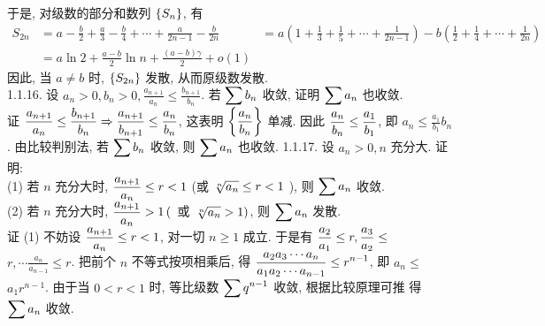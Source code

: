 \documentclass[a4paper,11pt,UTF8]{article}
\begin{document}
于是, 对级数的部分和数列 $\displaystyle \displaystyle \displaystyle \left\{S_n\right\}$, 有
$$
\begin{aligned}
	S_{2 n}&=a-\frac{b}{2}+\frac{a}{3}-\frac{b}{4}+\cdots+\frac{a}{2 n-1}-\frac{b}{2 n}
	& =a\left(1+\frac{1}{3}+\frac{1}{5}+\cdots+\frac{1}{2 n-1}\right)-b\left(\frac{1}{2}+\frac{1}{4}+\cdots+\frac{1}{2 n}\right) \\
	& =a \ln 2+\frac{a-b}{2} \ln n+\frac{(a-b) \gamma}{2}+o(1)
\end{aligned}
$$
因此, 当 $a \neq b$ 时, $\displaystyle \displaystyle \displaystyle \left\{S_{2 n}\right\}$ 发散, 从而原级数发散.\\
1.1.16. 设 $a_n>0, b_n>0, \frac{a_{n+1}}{a_n} \leq \frac{b_{n+1}}{b_n}$. 若 $\displaystyle \displaystyle \displaystyle \sum b_n$ 收敛, 证明 $\displaystyle \displaystyle \displaystyle \sum a_n$ 也收敛.\\
证 $\displaystyle \displaystyle \displaystyle \frac{a_{n+1}}{a_n} \leq \frac{b_{n+1}}{b_n} \Rightarrow \frac{a_{n+1}}{b_{n+1}} \leq \frac{a_n}{b_n}$, 这表明 $\displaystyle \displaystyle \displaystyle \left\{\frac{a_n}{b_n}\right\}$ 单减. 因此 $\displaystyle \displaystyle \displaystyle \frac{a_n}{b_n} \leq \frac{a_1}{b_1}$, 即 $a_n \leq \frac{a_1}{b_1} b_n$. 由比较判别法, 若 $\displaystyle \displaystyle \displaystyle \sum b_n$ 收敛, 则 $\displaystyle \displaystyle \displaystyle \sum a_n$ 也收敛.
1.1.17. 设 $a_n>0, n$ 充分大. 证明:\\
(1) 若 $n$ 充分大时, $\displaystyle \displaystyle \displaystyle \frac{a_{n+1}}{a_n} \leq r<1$ (或 $\displaystyle \displaystyle \displaystyle \sqrt[n]{a_n} \leq r<1$ ), 则 $\displaystyle \displaystyle \displaystyle \sum a_n$ 收敛.\\
(2) 若 $n$ 充分大时, $\displaystyle \displaystyle \displaystyle \frac{a_{n+1}}{a_n}>1\left(\right.$ 或 $\displaystyle \displaystyle \displaystyle \left.\sqrt[n]{a_n}>1\right)$, 则 $\displaystyle \displaystyle \displaystyle \sum a_n$ 发散.\\
证 (1) 不妨设 $\displaystyle \displaystyle \displaystyle \frac{a_{n+1}}{a_n} \leq r<1$, 对一切 $n \geq 1$ 成立. 于是有 $\displaystyle \displaystyle \displaystyle \frac{a_2}{a_1} \leq r, \frac{a_3}{a_2} \leq$ $r, \cdots \frac{a_n}{a_{n-1}} \leq r$. 把前个 $n$ 不等式按项相乘后, 得 $\displaystyle \displaystyle \displaystyle \frac{a_2 a_3 \cdots a_n}{a_1 a_2 \cdots a_{n-1}} \leq r^{n-1}$, 即 $a_n \leq$ $a_1 r^{n-1}$. 由于当 $0<r<1$ 时, 等比级数 $\displaystyle \displaystyle \displaystyle \sum q^{n-1}$ 收敛, 根据比较原理可推 得 $\displaystyle \displaystyle \displaystyle \sum a_n$ 收敛.\\
\end{document}
